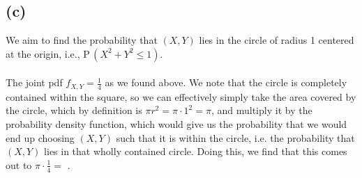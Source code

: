\documentclass{article}
\begin{document}
{\subsection*{(c)}
We aim to find the probability that $(X, Y)$ lies in the circle of radius 1 centered at the origin, i.e., $\mathrm P \,(X^2 + Y^ 2 \le 1)$. \\ \\ 
The joint pdf $f_{X, Y} = \frac{1}{4}$ as we found above. We note that the circle is completely contained within the square, so we can effectively simply take the area covered by the circle, which by definition is $\pi r^2 = \pi \cdot 1^2 = \pi$, and multiply it by the probability density function, which would give us the probability that we would end up choosing $(X, Y)$ such that it is within the circle, i.e. the probability that $(X, Y)$ lies in that wholly contained circle. Doing this, we find that this comes out to $\pi \cdot \frac{1}{4} = $ .

}
\end{document}
